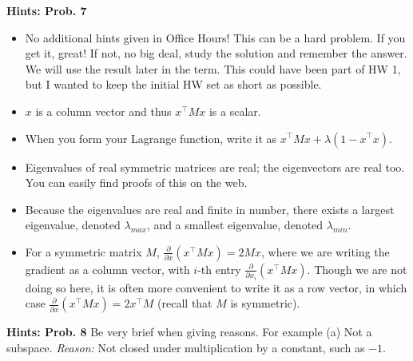 \documentclass[letterpaper]{article}
\begin{document}
\noindent \textbf{Hints: Prob. 7}
\begin{itemize}
\item No additional hints given in Office Hours! This can be a hard problem. If you get it, great! If not, no big deal, study the solution and remember the answer. We will use the result later in the term. This could have been part of HW 1, but I wanted to keep the initial HW set as short as possible.
    \item $x$ is a column vector and thus $x^\top M x$ is a scalar.
    \item When you form your Lagrange function, write it as $x^\top M x + \lambda (1 -x^\top x)$.
\item Eigenvalues of real symmetric matrices are real; the eigenvectors are real too. You can easily find proofs of this on the web.
\item Because the eigenvalues are real and finite in number, there exists a largest eigenvalue, denoted $\lambda_{max}$, and a smallest eigenvalue, denoted $\lambda_{min}$.
\item For a symmetric matrix $M$, $\frac{\partial }{\partial x} (x^\top M x) = 2 M x$, where we are writing the gradient as a column vector, with $i$-th entry $\frac{\partial }{\partial x_i} (x^\top M x)$. Though we are not doing so here, it is often more convenient to write it as a row vector, in which case $\frac{\partial }{\partial x} (x^\top M x) = 2 x^\top M $ (recall that $M$ is symmetric).

\end{itemize}

\vspace{1cm}

\noindent \textbf{Hints: Prob. 8} Be very brief when giving reasons. For example (a) Not a subspace. \textit{Reason:} Not closed under multiplication by a constant, such as $-1$.
\end{document}
